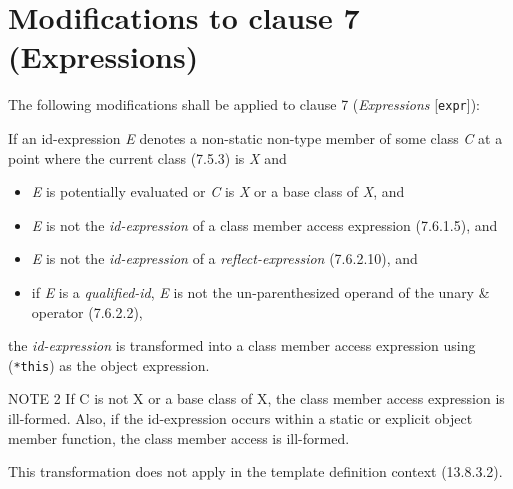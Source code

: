 \section{Modifications to clause 7 (Expressions)}

The following modifications shall be applied to clause 7 (\emph{Expressions}
[\texttt{expr}]):

\begin{removal}
\end{removal}

\begin{modification}
If an id-expression \emph{E} denotes a non-static non-type member of some class
\emph{C} at a point where the current class (7.5.3) is \emph{X} and

\begin{itemize}[label=\textemdash]

\item
\emph{E} is potentially evaluated or \emph{C} is \emph{X} or a base class of
\emph{X}, and

\item
\emph{E} is not the \emph{id-expression} of a class member access expression (7.6.1.5), and

\item
\emph{E} is not the \emph{id-expression} of a \emph{reflect-expression} (7.6.2.10), and

\item
if \emph{E} is a \emph{qualified-id}, \emph{E} is not the un-parenthesized operand of
the unary \& operator (7.6.2.2),

\end{itemize}

the \emph{id-expression} is transformed into a class member access expression
using (\texttt{*this}) as the object expression.

\newline

NOTE 2 If C is not X or a base class of X, the class member access expression is ill-formed. Also, if the id-expression occurs within a static or explicit object member function, the class member access is ill-formed.
\newline

This transformation does not apply in the template definition context (13.8.3.2).
\end{modification}

